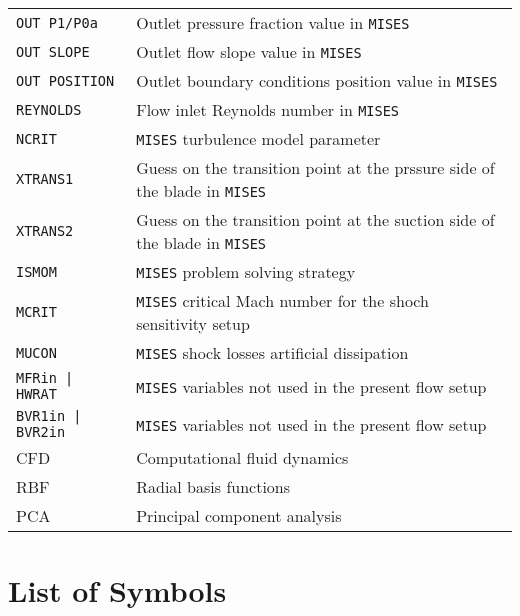 \documentclass{config/polimiThesis}
\begin{document}
\begin{longtable}{p{2.5cm}p{8cm}}
    \texttt{OUT P1/P0a} & Outlet pressure fraction value in \texttt{MISES} \\
    \texttt{OUT SLOPE} & Outlet flow slope value in \texttt{MISES} \\
    \texttt{OUT POSITION} & Outlet boundary conditions position value in \texttt{MISES} \\   
    \texttt{REYNOLDS} & Flow inlet Reynolds number in \texttt{MISES} \\ 
    \texttt{NCRIT} & \texttt{MISES} turbulence model parameter \\
    \texttt{XTRANS1} & Guess on the transition point at the prssure side of the blade in \texttt{MISES} \\
    \texttt{XTRANS2} & Guess on the transition point at the suction side of the blade in \texttt{MISES} \\
    \texttt{ISMOM} & \texttt{MISES} problem solving strategy \\
    \texttt{MCRIT} & \texttt{MISES} critical Mach number for the shoch sensitivity setup \\
    \texttt{MUCON} & \texttt{MISES} shock losses artificial dissipation \\
    \texttt{MFRin | HWRAT} & \texttt{MISES} variables not used in the present flow setup \\ 
    \texttt{BVR1in | BVR2in} & \texttt{MISES} variables not used in the present flow setup \\ 
    CFD & Computational fluid dynamics \\ 
    RBF & Radial basis functions \\
    PCA & Principal component analysis \\ 
    \hline
\end{longtable}

\chapter*{List of Symbols}
\end{document}
